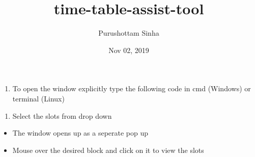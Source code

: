 \documentclass[letterpaper,10pt,english]{sphinxmanual}
\title{time-table-assist-tool}
\date{Nov 02, 2019}
\author{Purushottam Sinha}
\begin{document}
\pagestyle{empty}
\sphinxmaketitle
\pagestyle{plain}
\sphinxtableofcontents
\pagestyle{normal}
\label{\detokenize{index::doc}}



\chapter{}
\label{\detokenize{user_manual:user-manual}}\label{\detokenize{user_manual::doc}}

\section{}
\label{\detokenize{user_manual:working-in-gui-1}}

\subsection{}
\label{\detokenize{user_manual:steps}}
\begin{enumerate}
%
\item {} 
To open the window explicitly type the following code in cmd (Windows) or terminal (Linux)

\end{enumerate}

\begin{sphinxVerbatim}[commandchars=\\\{\}]
 
\end{sphinxVerbatim}
\begin{enumerate}
%
\setcounter{enumi}{1}
\item {} 
Select the slots from drop down

\end{enumerate}
\begin{itemize}
\item {} 
The window opens up as a seperate pop up

\end{itemize}

\begin{itemize}
\item {} 
Mouse over the desired block and click on it to view the slots

\end{itemize}
\end{document}
